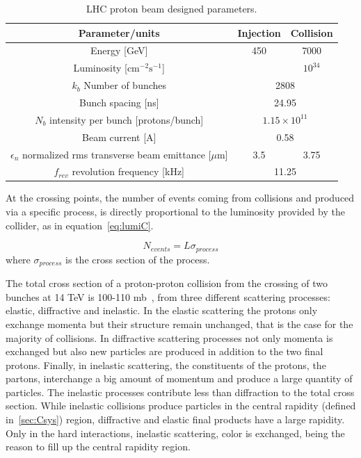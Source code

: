 \begin{table}[htbH]
\begin{center}
\caption{LHC proton beam designed parameters.\label{tab:LHCparams}}
\begin{tabular}{|c|c c|}
\hline 
Parameter/units & Injection & Collision \\
\hline
Energy [GeV]& 450 & 7000 \\ 
Luminosity [$\text{cm}^{-2}\text{s}^{-1}$] & & $10^{34}$ \\
$k_{b}$ Number of bunches & \multicolumn{2}{c|}{2808} \\
Bunch spacing [ns] & \multicolumn{2}{c|}{24.95} \\
$N_{b}$ intensity per bunch [protons/bunch] & \multicolumn{2}{c|}{$1.15\times 10^{11}$} \\
Beam current [A] & \multicolumn{2}{c|}{0.58} \\
$\epsilon_{n}$ normalized rms transverse beam emittance [$\mu$m] & 3.5 & 3.75 \\ 
$f_{rev}$ revolution frequency [kHz] & \multicolumn{2}{c|}{11.25} \\
\hline
\end{tabular}
\end{center}
\end{table}

At the crossing points, the number of events coming from collisions and produced via a specific process, is directly proportional to the luminosity provided by the collider, as in equation~\ref{eq:lumiC}.

\begin{equation}
  \label{eq:lumiN}
  N_{events}=L\sigma_{process}
\end{equation} where $\sigma_{process}$ is the cross section of the process. 

The total cross section of a proton-proton collision from the crossing of two bunches at 14 TeV is 100-110 mb~\cite{Augier:1993ta}, from three different scattering processes: elastic, diffractive and inelastic. In the elastic scattering the protons only exchange momenta but their structure remain unchanged, that is the case for the majority of collisions. In diffractive scattering processes not only momenta is exchanged but also new particles are produced in addition to the two final protons. Finally, in inelastic scattering, the constituents of the protons, the partons, interchange a big amount of momentum and produce a large quantity of particles. The inelastic processes contribute less than diffraction to the total cross section. While inelastic collisions produce particles in the central rapidity (defined in~\ref{sec:Csys}) region, diffractive and elastic final products have a large rapidity. Only in the hard interactions, inelastic scattering, color is exchanged, being the reason to fill up the central rapidity region. 

